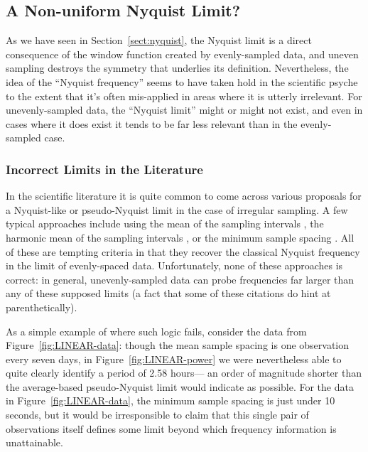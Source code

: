 \documentclass[preprint]{aastex}
\newcommand{\fig}[1]{Figure~\ref{fig:#1}}
\newcommand{\Sect}[1]{Section~\ref{sect:#1}}
\newcommand{\sect}[1]{\Sect{#1}}
\newcommand{\sectlabel}[1]{\label{sect:#1}}
\begin{document}
\subsection{A Non-uniform Nyquist Limit?}
\sectlabel{pseudo-nyquist}

As we have seen in \sect{nyquist}, the Nyquist limit is a direct consequence
of the window function created by evenly-sampled data,
and uneven sampling destroys the symmetry that underlies its definition.
Nevertheless, the idea of the ``Nyquist frequency'' seems to have taken hold
in the scientific psyche to the extent that it's often mis-applied in areas
where it is utterly irrelevant.
For unevenly-sampled data, the ``Nyquist limit'' might or might not exist,
and even in cases where it does exist it tends to be far less relevant than
in the evenly-sampled case.

\subsubsection{Incorrect Limits in the Literature}

In the scientific literature it is quite common to come across various proposals
for a Nyquist-like or pseudo-Nyquist limit in the case of irregular sampling.
A few typical approaches include using the mean of the sampling intervals
\citep[e.g.][]{Scargle82, Horne86, NumRec},
the harmonic mean of the sampling intervals \citep[e.g.][]{Debosscher07},
or the minimum sample spacing \citep[e.g.][]{Percy86, Roberts87, Press89, Hilditch01}.
All of these are tempting criteria in that they recover the classical Nyquist 
frequency in the limit of evenly-spaced data.
Unfortunately, none of these approaches is correct: in general,
unevenly-sampled data can probe frequencies far larger than any of these
supposed limits (a fact that some of these citations do hint at
parenthetically).

As a simple example of where such logic fails,
consider the data from \fig{LINEAR-data}: though the mean sample
spacing is one observation every seven days, in \fig{LINEAR-power}
we were nevertheless able to quite clearly identify a period of 2.58 hours---
an order of magnitude shorter than the average-based pseudo-Nyquist limit
would indicate as possible.
For the data in \fig{LINEAR-data}, the minimum sample spacing is just under 10
seconds, but it would be irresponsible to claim that this single pair of
observations itself defines some limit beyond which frequency information is
unattainable.
\end{document}
